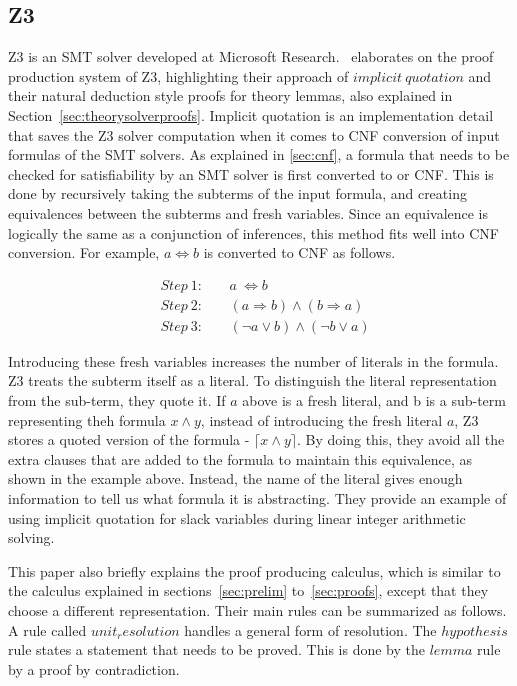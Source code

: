 \documentclass{article}
\begin{document}
\subsection{Z3}
\label{sec:z3}
Z3 is an SMT solver developed at Microsoft 
Research.~\cite{DBLP:conf/lpar/MouraB08} elaborates on the proof 
production system of Z3, highlighting their approach of 
$implicit\ quotation$ and their natural deduction style 
proofs for theory lemmas, also explained in 
Section~\ref{sec:theorysolverproofs}. Implicit quotation is an 
implementation detail that saves the Z3 solver 
computation when it comes to CNF conversion of input
formulas of the SMT solvers. As explained in 
\ref{sec:cnf}, a formula that needs to be checked 
for satisfiability by an SMT solver is first converted 
to or CNF. This is done by 
recursively taking the subterms of the input formula, 
and creating equivalences between the subterms and 
fresh variables. Since an equivalence is logically 
the same as a conjunction of inferences, this method 
fits well into CNF conversion. For example, 
$a \iff b$ is converted to CNF as follows.

\begin{align*}
&Step\ 1:&\ &a\ \iff b \\
&Step\ 2:&\ &(a \Rightarrow b) \land (b \Rightarrow a) \\
&Step\ 3:&\ &(\neg a \lor b) \land (\neg b \lor a) 
\end{align*}

Introducing these fresh variables increases the 
number of literals in the formula. Z3 treats the 
subterm itself as a literal. To distinguish the 
literal representation from the sub-term, they quote
it. If $a$ above is a fresh literal, and b is a 
sub-term representing theh formula $x \land y$,
instead of introducing the fresh literal $a$, 
Z3 stores a quoted version of the formula - 
$\lceil x \land y \rceil$. By doing this, they 
avoid all the extra clauses that are added to the 
formula to maintain this equivalence, as 
shown in the example above. Instead, the name of the 
literal gives enough information to tell us 
what formula it is abstracting. They provide an 
example of using implicit quotation for slack
variables during linear integer arithmetic solving.

This paper also briefly explains the proof producing 
calculus, which is similar to the calculus explained in
sections~\ref{sec:prelim} to~\ref{sec:proofs}, 
except that they choose a different representation. 
Their main rules can be summarized as follows. A rule called 
$unit_resolution$ handles a general form of resolution.
The $hypothesis$ rule states a statement that needs to 
be proved. This is done by the $lemma$ rule by 
a proof by contradiction.
\end{document}
